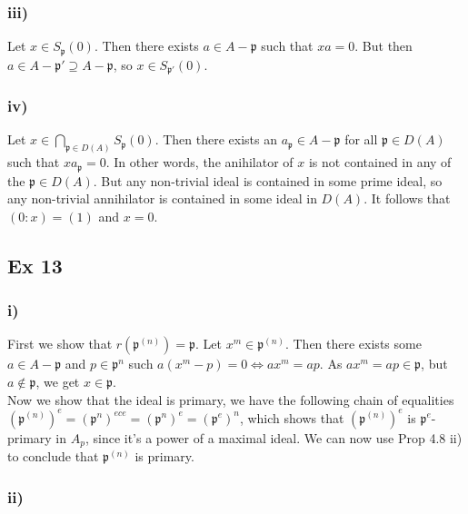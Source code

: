 \documentclass{article}
\theoremstyle{definition}
\begin{document}
\subsubsection*{iii)}

Let $x \in S_{\mathfrak{p}}(0)$. Then there exists $a \in A - \mathfrak{p}$
such that $xa = 0$. But then $a \in A - \mathfrak{p}' \supseteq A -
\mathfrak{p}$, so $x \in S_{\mathfrak{p'}}(0)$.

\subsubsection*{iv)}

Let $x \in \bigcap_{\mathfrak{p} \in D(A)} S_{\mathfrak{p}}(0)$. Then there
exists an $a_{\mathfrak{p}} \in A - \mathfrak{p}$ for all $\mathfrak{p} \in
D(A)$ such that $xa_{\mathfrak{p}} = 0$. In other words, the anihilator of $x$
is not contained in any of the $\mathfrak{p} \in D(A)$. But any non-trivial
ideal is contained in some prime ideal, so any non-trivial annihilator is
contained in some ideal in $D(A)$. It follows that $(0:x) = (1)$ and $x = 0$.

\subsection*{Ex 13}

\subsubsection*{i)}

First we show that $r(\mathfrak{p}^{(n)}) = \mathfrak{p}$. Let $x^m \in
\mathfrak{p}^{(n)}$. Then there exists some $a \in A - \mathfrak{p}$ and $p \in
\mathfrak{p}^{n}$ such $a(x^{m} - p) = 0 \Leftrightarrow ax^{m} = ap$. As
$ax^{m} = ap \in \mathfrak{p}$, but $a \not \in \mathfrak{p}$, we get $x \in
\mathfrak{p}$. \\

Now we show that the ideal is primary, we have the following chain of
equalities $(\mathfrak{p}^{(n)})^{e} = (\mathfrak{p}^{n})^{ece} =
(\mathfrak{p}^{n})^{e} = (\mathfrak{p}^{e})^{n}$, which shows that
$(\mathfrak{p}^{(n)})^{e}$ is $\mathfrak{p}^{e}$-primary in $A_{p}$, since it's
a power of a maximal ideal. We can now use Prop 4.8 ii) to conclude that
$\mathfrak{p}^{(n)}$ is primary. 


\subsubsection*{ii)}
\end{document}
